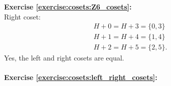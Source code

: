 \noindent\textbf{Exercise \ref{exercise:cosets:Z6_cosets}:}
\\
Right coset:
\begin{gather*}
H + 0 = H + 3 = \{0, 3\}
\\
H + 1 = H + 4 = \{ 1, 4 \} 
\\
H + 2 = H + 5 = \{ 2, 5 \}.
\end{gather*}
Yes, the left and right cosets are equal.
\\
\\
\textbf{Exercise \ref{exercise:cosets:left_right_cosets}:}
%
